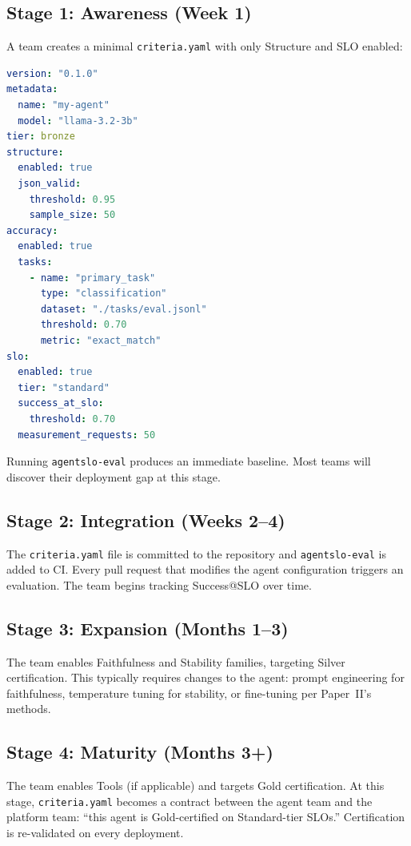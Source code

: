 \documentclass[11pt]{article}
\newcommand{\criteriayaml}{\texttt{criteria.yaml}}
\begin{document}
\subsection{Stage 1: Awareness (Week 1)}

A team creates a minimal \criteriayaml{} with only Structure and SLO enabled:

\begin{lstlisting}[language=yaml, caption={Minimal Bronze-tier \criteriayaml{} for initial adoption.}]
version: "0.1.0"
metadata:
  name: "my-agent"
  model: "llama-3.2-3b"
tier: bronze
structure:
  enabled: true
  json_valid:
    threshold: 0.95
    sample_size: 50
accuracy:
  enabled: true
  tasks:
    - name: "primary_task"
      type: "classification"
      dataset: "./tasks/eval.jsonl"
      threshold: 0.70
      metric: "exact_match"
slo:
  enabled: true
  tier: "standard"
  success_at_slo:
    threshold: 0.70
  measurement_requests: 50
\end{lstlisting}

Running \texttt{agentslo-eval} produces an immediate baseline. Most teams will discover their deployment gap at this stage.

\subsection{Stage 2: Integration (Weeks 2--4)}

The \criteriayaml{} file is committed to the repository and \texttt{agentslo-eval} is added to CI. Every pull request that modifies the agent configuration triggers an evaluation. The team begins tracking Success@SLO over time.

\subsection{Stage 3: Expansion (Months 1--3)}

The team enables Faithfulness and Stability families, targeting Silver certification. This typically requires changes to the agent: prompt engineering for faithfulness, temperature tuning for stability, or fine-tuning per Paper~II's methods.

\subsection{Stage 4: Maturity (Months 3+)}

The team enables Tools (if applicable) and targets Gold certification. At this stage, \criteriayaml{} becomes a contract between the agent team and the platform team: ``this agent is Gold-certified on Standard-tier SLOs.'' Certification is re-validated on every deployment.
\end{document}
